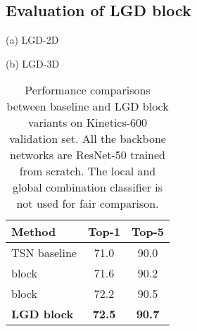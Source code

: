 \documentclass[10pt,twocolumn,letterpaper]{article}
\begin{document}
\subsection{Evaluation of LGD block}
\begin{table}
\centering
\caption{\small Performance comparisons between baseline and LGD block variants on Kinetics-600 validation set. All the backbone networks are ResNet-50 trained from scratch. The local and global combination classifier is not used for fair comparison.}
\begin{minipage}{0.23\textwidth}
\small
\centering
\vspace{0.1cm}
(a) LGD-2D
\vspace{0.1cm}
\end{minipage}
\begin{minipage}{0.23\textwidth}
\small
\centering
\vspace{0.1cm}
(b) LGD-3D
\vspace{0.1cm}
\end{minipage}
\begin{minipage}{0.23\textwidth}
\small
\centering
\begin{tabular}{@{~}l@{~}|@{~}c@{~}|@{~}c@{~}} \hline
\begin{minipage}{1.8cm}\vspace{0.12cm} \textbf{Method} \vspace{0.12cm}\end{minipage}     & \textbf{Top-1} & \textbf{Top-5} \\ \hline
\begin{minipage}{1.8cm}\vspace{0.12cm} TSN baseline \vspace{0.12cm}\end{minipage}     & 71.0 & 90.0 \\
\begin{minipage}{1.8cm}\vspace{0.12cm} block \vspace{0.12cm}\end{minipage}     & 71.6 & 90.2 \\
\begin{minipage}{1.8cm}\vspace{0.12cm} block \vspace{0.12cm}\end{minipage}     & 72.2 & 90.5 \\ \hline
\begin{minipage}{1.8cm}\vspace{0.12cm} \textbf{LGD block} \vspace{0.12cm}\end{minipage}     & \textbf{72.5} & \textbf{90.7} \\ \hline

\end{tabular}
\end{minipage}
\end{table}
\end{document}
